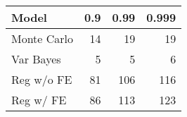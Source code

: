 \begin{tabular}{lrrr}
  \hline
Model & 0.9 & 0.99 & 0.999 \\ 
  \hline
Monte Carlo & 14 & 19 & 19 \\ 
  Var Bayes & 5 & 5 & 6 \\ 
  Reg w/o FE & 81 & 106 & 116 \\ 
  Reg w/ FE & 86 & 113 & 123 \\ 
   \hline
\end{tabular}
